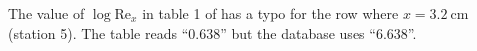 The value of $\log \mathrm{Re}_x$ in table 1 of
\citet{SchultzGrunowF+1940+deu+JOUR} has a typo for the row where $x =
\SI{3.2}{\cm}$ (station 5).  The table reads ``0.638'' but the database uses
``6.638''.
